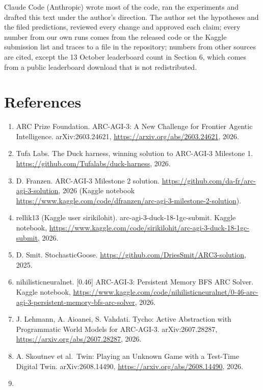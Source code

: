 \documentclass[
  11pt,
]{article}
\providecommand{\tightlist}{%
  \setlength{\itemsep}{0pt}\setlength{\parskip}{0pt}}
\begin{document}
Claude Code (Anthropic) wrote most of the code, ran the experiments and
drafted this text under the author's direction. The author set the
hypotheses and the filed predictions, reviewed every change and approved
each claim; every number from our own runs comes from the released code
or the Kaggle submission list and traces to a file in the repository;
numbers from other sources are cited, except the 13 October leaderboard
count in Section 6, which comes from a public leaderboard download that
is not redistributed.

\section{References}\label{references}

\begin{enumerate}
\def\labelenumi{\arabic{enumi}.}
\tightlist
\item
  ARC Prize Foundation. ARC-AGI-3: A New Challenge for Frontier Agentic
  Intelligence. arXiv:2603.24621,
  \url{https://arxiv.org/abs/2603.24621}, 2026.
\item
  Tufa Labs. The Duck harness, winning solution to ARC-AGI-3 Milestone
  1. \url{https://github.com/Tufalabs/duck-harness}, 2026.
\item
  D. Franzen. ARC-AGI-3 Milestone 2 solution.
  \url{https://github.com/da-fr/arc-agi-3-solution}, 2026 (Kaggle
  notebook
  \url{https://www.kaggle.com/code/dfranzen/arc-agi-3-milestone-2-solution}).
\item
  rellik13 (Kaggle user sirikilohit). arc-agi-3-duck-18-1gc-submit.
  Kaggle notebook,
  \url{https://www.kaggle.com/code/sirikilohit/arc-agi-3-duck-18-1gc-submit},
  2026.
\item
  D. Smit. StochasticGoose.
  \url{https://github.com/DriesSmit/ARC3-solution}, 2025.
\item
  nihilisticneuralnet. {[}0.46{]} ARC-AGI-3: Persistent Memory BFS ARC
  Solver. Kaggle notebook,
  \url{https://www.kaggle.com/code/nihilisticneuralnet/0-46-arc-agi-3-persistent-memory-bfs-arc-solver},
  2026.
\item
  J. Lehmann, A. Aioanei, S. Vahdati. Tycho: Active Abstraction with
  Programmatic World Models for ARC-AGI-3. arXiv:2607.28287,
  \url{https://arxiv.org/abs/2607.28287}, 2026.
\item
  A. Skoutnev et al.~Twin: Playing an Unknown Game with a Test-Time
  Digital Twin. arXiv:2608.14490,
  \url{https://arxiv.org/abs/2608.14490}, 2026.
\item

\end{enumerate}
\end{document}
